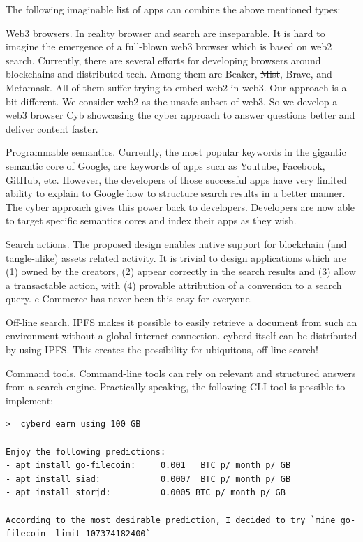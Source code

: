 \documentclass[8pt,oneside]{amsart}
\newcommand{\code}[1]{{\PlayBold #1}}
\begin{document}
\begin{Abstract}
The following imaginable list of apps can combine the above mentioned types:

\code{Web3 browsers}. In reality browser and search are inseparable. It is hard to imagine the emergence of a full-blown web3 browser which is based on web2 search. Currently, there are several efforts for developing browsers around blockchains and distributed tech. Among them are Beaker, \sout{Mist}, Brave, and Metamask. All of them suffer trying to embed web2 in web3. Our approach is a bit different. We consider web2 as the unsafe subset of web3. So we develop a web3 browser Cyb showcasing the cyber approach to answer questions better and deliver content faster.

\code{Programmable semantics}. Currently, the most popular keywords in the gigantic semantic core of Google, are keywords of apps such as Youtube, Facebook, GitHub, etc. However, the developers of those successful apps have very limited ability to explain to Google how to structure search results in a better manner. The cyber approach gives this power back to developers. Developers are now able to target specific semantics cores and index their apps as they wish.

\code{Search actions}. The proposed design enables native support for blockchain (and tangle-alike) assets related activity. It is trivial to design applications which are (1) owned by the creators, (2) appear correctly in the search results and (3) allow a transactable action, with (4) provable attribution of a conversion to a search query. e-Commerce has never been this easy for everyone.

\code{Off-line search}. IPFS makes it possible to easily retrieve a document from such an environment without a global internet connection. cyberd itself can be distributed by using IPFS. This creates the possibility for ubiquitous, off-line search!

\code{Command tools}. Command-line tools can rely on relevant and structured answers from a search engine. Practically speaking, the following CLI tool is possible to implement:

\begin{lstlisting}
>  cyberd earn using 100 GB

Enjoy the following predictions:
- apt install go-filecoin:     0.001   BTC p/ month p/ GB
- apt install siad:            0.0007  BTC p/ month p/ GB
- apt install storjd:          0.0005 BTC p/ month p/ GB

According to the most desirable prediction, I decided to try `mine go-filecoin -limit 107374182400`


\end{lstlisting}
\end{Abstract}
\end{document}
